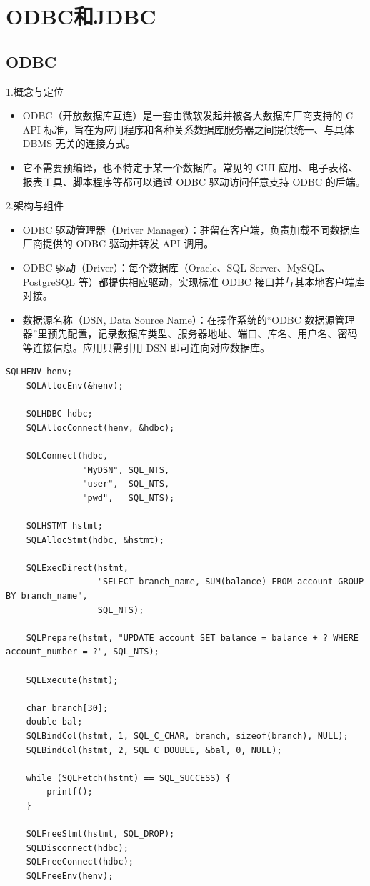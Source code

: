 \section{ODBC和JDBC}

\subsection{ODBC}

1.概念与定位

\begin{itemize}
    \item ODBC（开放数据库互连）是一套由微软发起并被各大数据库厂商支持的 C API 标准，旨在为应用程序和各种关系数据库服务器之间提供统一、与具体 DBMS 无关的连接方式。
    \item 它不需要预编译，也不特定于某一个数据库。常见的 GUI 应用、电子表格、报表工具、脚本程序等都可以通过 ODBC 驱动访问任意支持 ODBC 的后端。
\end{itemize}

2.架构与组件

\begin{itemize}
    \item ODBC 驱动管理器（Driver Manager）：驻留在客户端，负责加载不同数据库厂商提供的 ODBC 驱动并转发 API 调用。
    \item ODBC 驱动（Driver）：每个数据库（Oracle、SQL Server、MySQL、PostgreSQL 等）都提供相应驱动，实现标准 ODBC 接口并与其本地客户端库对接。
    \item 数据源名称（DSN, Data Source Name）：在操作系统的“ODBC 数据源管理器”里预先配置，记录数据库类型、服务器地址、端口、库名、用户名、密码等连接信息。应用只需引用 DSN 即可连向对应数据库。
\end{itemize}

\begin{lstlisting}[style=cppstyle]
    SQLHENV henv;
    SQLAllocEnv(&henv);
    
    SQLHDBC hdbc;
    SQLAllocConnect(henv, &hdbc);

    SQLConnect(hdbc,
               "MyDSN", SQL_NTS,    
               "user",  SQL_NTS,   
               "pwd",   SQL_NTS);  
    
    SQLHSTMT hstmt;
    SQLAllocStmt(hdbc, &hstmt);
    
    SQLExecDirect(hstmt,
                  "SELECT branch_name, SUM(balance) FROM account GROUP BY branch_name",
                  SQL_NTS);

    SQLPrepare(hstmt, "UPDATE account SET balance = balance + ? WHERE account_number = ?", SQL_NTS);

    SQLExecute(hstmt);

    char branch[30];
    double bal;
    SQLBindCol(hstmt, 1, SQL_C_CHAR, branch, sizeof(branch), NULL);
    SQLBindCol(hstmt, 2, SQL_C_DOUBLE, &bal, 0, NULL);
    
    while (SQLFetch(hstmt) == SQL_SUCCESS) {
        printf();
    }

    SQLFreeStmt(hstmt, SQL_DROP);
    SQLDisconnect(hdbc);
    SQLFreeConnect(hdbc);
    SQLFreeEnv(henv);        
\end{lstlisting}

